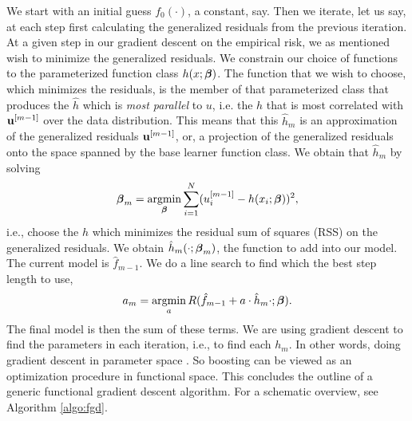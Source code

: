 We start with an initial guess $f_0(\cdot)$, a constant, say. Then we iterate, let us say, at each step first calculating the generalized residuals from the previous iteration. At a given step in our gradient descent on the empirical risk, we as mentioned wish to minimize the generalized residuals. We constrain our choice of functions to the parameterized function class $h(x;\boldsymbol{\beta})$. The function that we wish to choose, which minimizes the residuals, is the member of that parameterized class that produces the $\hat{h}$ which is \textit{most parallel} to $u$, i.e. the $h$ that is most correlated with $\mathbf{u}^{[m-1]}$ over the data distribution. This means that this $\hat{h}_m$ is an approximation of the generalized residuals $\mathbf{u}^{[m-1]}$, or, a projection of the generalized residuals onto the space spanned by the base learner function class. We obtain that $\hat{h}_m$ by solving
\begin{equation}
    \boldsymbol{\beta}_m=\operatorname*{argmin}_{\boldsymbol{\beta}} \sum_{i=1}^N (u_i^{[m-1]}-h(x_i;\boldsymbol{\beta}))^2,
\end{equation}
i.e., choose the $h$ which minimizes the residual sum of squares (RSS) on the generalized residuals. We obtain $\hat{h}_m(\cdot;\boldsymbol{\beta}_m)$, the function to add into our model. The current model is $\hat{f}_{m-1}$. We do a line search to find which the best step length to use,
\begin{equation*}
    a_m=\operatorname*{argmin}_{a}R(\hat{f}_{m-1}+a\cdot\hat{h}_m{\cdot;\boldsymbol{\beta}}).
\end{equation*}
The final model is then the sum of these terms. We are using gradient descent to find the parameters in each iteration, i.e., to find each $h_m$. In other words, doing gradient descent in parameter space \citep{friedman2001}. So boosting can be viewed as an optimization procedure in functional space. This concludes the outline of a generic functional gradient descent algorithm. For a schematic overview, see Algorithm \ref{algo:fgd}.
